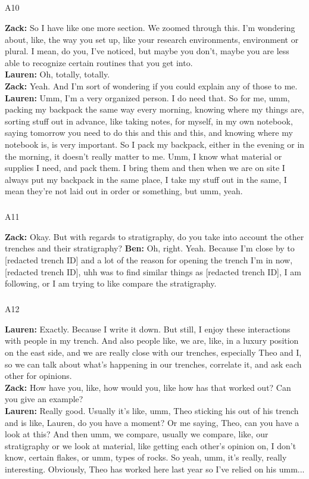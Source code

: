 \documentclass[
]{article}
\makeatletter
\let\oldsubparagraph\subparagraph
\renewcommand{\subparagraph}{
    \@ifstar
      \xxxSubParagraphStar
      \xxxSubParagraphNoStar
  }
\newcommand{\xxxSubParagraphStar}[1]{\oldsubparagraph*{#1}\mbox{}}
\newcommand{\xxxSubParagraphNoStar}[1]{\oldsubparagraph{#1}\mbox{}}
\makeatother
\begin{document}
\subparagraph{A10}\label{sec-A10}

\textbf{Zack:} So I have like one more section. We zoomed through this.
I'm wondering about, like, the way you set up, like your research
environments, environment or plural. I mean, do you, I've noticed, but
maybe you don't, maybe you are less able to recognize certain routines
that you get into.\\
\textbf{Lauren:} Oh, totally, totally.\\
\textbf{Zack:} Yeah. And I'm sort of wondering if you could explain any
of those to me.\\
\textbf{Lauren:} Umm, I'm a very organized person. I do need that. So
for me, umm, packing my backpack the same way every morning, knowing
where my things are, sorting stuff out in advance, like taking notes,
for myself, in my own notebook, saying tomorrow you need to do this and
this and this, and knowing where my notebook is, is very important. So I
pack my backpack, either in the evening or in the morning, it doesn't
really matter to me. Umm, I know what material or supplies I need, and
pack them. I bring them and then when we are on site I always put my
backpack in the same place, I take my stuff out in the same, I mean
they're not laid out in order or something, but umm, yeah.

\subparagraph{A11}\label{sec-A11}

\textbf{Zack:} Okay. But with regards to stratigraphy, do you take into
account the other trenches and their stratigraphy? \textbf{Ben:} Oh,
right. Yeah. Because I'm close by to {[}redacted trench ID{]} and a lot
of the reason for opening the trench I'm in now, {[}redacted trench
ID{]}, uhh was to find similar things as {[}redacted trench ID{]}, I am
following, or I am trying to like compare the stratigraphy.

\subparagraph{A12}\label{sec-A12}

\textbf{Lauren:} Exactly. Because I write it down. But still, I enjoy
these interactions with people in my trench. And also people like, we
are, like, in a luxury position on the east side, and we are really
close with our trenches, especially Theo and I, so we can talk about
what's happening in our trenches, correlate it, and ask each other for
opinions.\\
\textbf{Zack:} How have you, like, how would you, like how has that
worked out? Can you give an example?\\
\textbf{Lauren:} Really good. Usually it's like, umm, Theo sticking his
out of his trench and is like, Lauren, do you have a moment? Or me
saying, Theo, can you have a look at this? And then umm, we compare,
usually we compare, like, our stratigraphy or we look at material, like
getting each other's opinion on, I don't know, certain flakes, or umm,
types of rocks. So yeah, umm, it's really, really interesting.
Obviously, Theo has worked here last year so I've relied on his umm...
\end{document}
